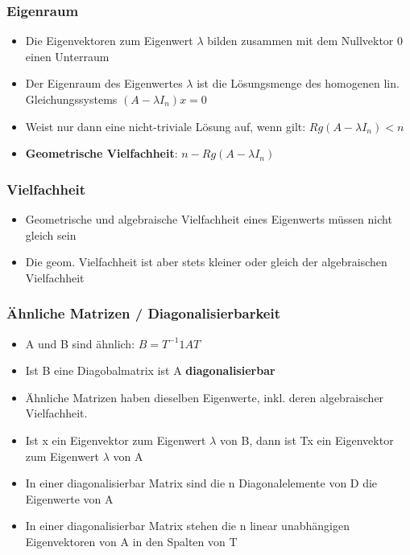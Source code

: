 \documentclass[8pt,a4paper]{scrartcl}
\begin{document}
\begin{multicols*}{3}
			\subsubsection{Eigenraum}				
				\begin{itemize}\itemsep0pt		
					\item Die Eigenvektoren zum Eigenwert $\lambda$ bilden zusammen mit dem Nullvektor 0 einen Unterraum
					\item Der Eigenraum des Eigenwertes $\lambda$ ist die Lösungsmenge des homogenen lin. Gleichungssystems $(A - \lambda I_{n})x = 0$
					\item Weist nur dann eine nicht-triviale Lösung auf, wenn gilt: $Rg(A - \lambda I_{n}) < n$
					\item \textbf{Geometrische Vielfachheit}: $n - Rg(A - \lambda I_{n})$
				\end{itemize}
			
			\subsubsection{Vielfachheit}		
				\begin{itemize}\itemsep0pt	
					\item Geometrische und algebraische Vielfachheit eines Eigenwerts müssen nicht gleich sein
					\item Die geom. Vielfachheit ist aber stets kleiner oder gleich der algebraischen Vielfachheit
				\end{itemize}
				
			\subsubsection{Ähnliche Matrizen / Diagonalisierbarkeit}
				\begin{itemize}\itemsep0pt	
					\item A und B sind ähnlich: $B = T^{-1}1AT$
					\item Ist B eine Diagobalmatrix ist A \textbf{diagonalisierbar}
					\item Ähnliche Matrizen haben dieselben Eigenwerte, inkl. deren algebraischer Vielfachheit.
					\item Ist x ein Eigenvektor zum Eigenwert $\lambda$ von B, dann ist Tx ein Eigenvektor zum Eigenwert $\lambda$ von A
					\item In einer diagonalisierbar Matrix sind die n Diagonalelemente von D die Eigenwerte von A
					\item In einer diagonalisierbar Matrix stehen die n linear unabhängigen Eigenvektoren von A in den Spalten von T
				\end{itemize}
				

\end{multicols*}
\end{document}
